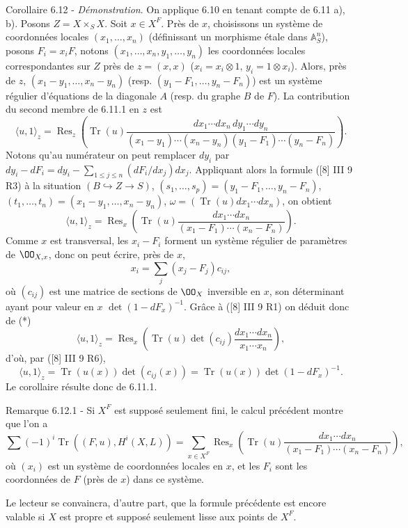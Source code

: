 \begin{statement}{Corollaire 6.12 -}
\emph{Démonstration}. On applique 6.10 en tenant compte de 6.11 a), b). Posons $Z=X\times_S X$. Soit $x\in X^F$. Près de $x$, choisissons un système de coordonnées locales $(x_1,\ldots,x_n)$ (définissant un morphisme étale dans $\mathbb{A}_S^n$), posons $F_i=x_iF$, notons $(x_1,\ldots,x_n,y_1,\ldots,y_n)$ les coordonnées locales correspondantes sur $Z$ près de $z=(x,x)$ ($x_i=x_i\otimes1$, $y_i=1\otimes x_i$). Alors, près de $z$, $(x_1-y_1,\ldots,x_n-y_n)$ (resp. $(y_1-F_1,\ldots,y_n-F_n)$) est un système régulier d'équations de la diagonale $A$ (resp. du graphe $B$ de $F$). La contribution du second membre de 6.11.1 en $z$ est
\[
\langle u,1\rangle_z=
\operatorname{Res}_z\left(\operatorname{Tr}(u)\frac{dx_1\cdots dx_n\,dy_1\cdots dy_n}{(x_1-y_1)\cdots(x_n-y_n)(y_1-F_1)\cdots(y_n-F_n)}\right).
\]
Notons qu'au numérateur on peut remplacer $dy_i$ par $dy_i-dF_i=dy_i-\sum_{1\le j\le n}(dF_i/dx_j)dx_j$. Appliquant alors la formule ([8] III 9 R3) à la situation $(B\hookrightarrow Z\to S)$, $(s_1,\ldots,s_p)=(y_1-F_1,\ldots,y_n-F_n)$, $(t_1,\ldots,t_n)=(x_1-y_1,\ldots,x_n-y_n)$, $\omega=(\operatorname{Tr}(u)dx_1\cdots dx_n)$, on obtient
\begin{equation}
\tag{*}
\langle u,1\rangle_z=
\operatorname{Res}_x\left(\operatorname{Tr}(u)\frac{dx_1\cdots dx_n}{(x_1-F_1)\cdots(x_n-F_n)}\right).
\end{equation}
Comme $x$ est transversal, les $x_i-F_i$ forment un système régulier de paramètres de $\OO_{X,x}$, donc on peut écrire, près de $x$,
\[
x_i=\sum_j(x_j-F_j)c_{ij},
\]
où $(c_{ij})$ est une matrice de sections de $\OO_X$ inversible en $x$, son déterminant ayant pour valeur en $x$ $\det(1-dF_x)^{-1}$. Grâce à ([8] III 9 R1) on déduit donc de (*)
\[
\langle u,1\rangle_z=\operatorname{Res}_x\left(\operatorname{Tr}(u)\det(c_{ij})\frac{dx_1\cdots dx_n}{x_1\cdots x_n}\right),
\]
d'où, par ([8] III 9 R6),
\[
\langle u,1\rangle_z=\operatorname{Tr}(u(x))\det(c_{ij}(x))=\operatorname{Tr}(u(x))\det(1-dF_x)^{-1}.
\]
Le
corollaire résulte donc de 6.11.1.
\end{statement}

\begin{statement}{Remarque 6.12.1 -}
Si $X^F$ est supposé seulement fini, le calcul précédent montre que l'on a
\[
\sum(-1)^i\operatorname{Tr}((F,u),H^i(X,L))=
\sum_{x\in X^F}\operatorname{Res}_x\left(\operatorname{Tr}(u)\frac{dx_1\cdots dx_n}{(x_1-F_1)\cdots(x_n-F_n)}\right),
\]
où $(x_i)$ est un système de coordonnées locales en $x$, et les $F_i$ sont les coordonnées de $F$ (près de $x$) dans ce système.

Le lecteur se convaincra, d'autre part, que la formule précédente est encore valable si $X$ est propre et supposé seulement lisse aux points de $X^F$.
\end{statement}

